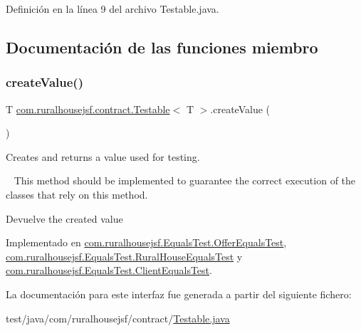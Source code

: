 Definición en la línea 9 del archivo Testable.\+java.



\subsection{Documentación de las funciones miembro}
\mbox{\label{interfacecom_1_1ruralhousejsf_1_1contract_1_1_testable_ae4546a381488faaba1ef7c0f8688de9c}} 
\subsubsection{\texorpdfstring{createValue()}{createValue()}}
{\footnotesize\ttfamily T \mbox{\hyperlink{interfacecom_1_1ruralhousejsf_1_1contract_1_1_testable}{com.\+ruralhousejsf.\+contract.\+Testable}}$<$ T $>$.create\+Value (\begin{DoxyParamCaption}{ }\end{DoxyParamCaption})}



Creates and returns a value used for testing. 

~\newline
 This method should be implemented to guarantee the correct execution of the classes that rely on this method.

\begin{DoxyReturn}{Devuelve}
the created value 
\end{DoxyReturn}


Implementado en \mbox{\hyperlink{classcom_1_1ruralhousejsf_1_1_equals_test_1_1_offer_equals_test_a25524d0ab8278899774751c0f7630e8d}{com.\+ruralhousejsf.\+Equals\+Test.\+Offer\+Equals\+Test}}, \mbox{\hyperlink{classcom_1_1ruralhousejsf_1_1_equals_test_1_1_rural_house_equals_test_abcab55b3e63c8d5511f04e395ff0f111}{com.\+ruralhousejsf.\+Equals\+Test.\+Rural\+House\+Equals\+Test}} y \mbox{\hyperlink{classcom_1_1ruralhousejsf_1_1_equals_test_1_1_client_equals_test_aa74f54ea042862db1a5499d31ec75539}{com.\+ruralhousejsf.\+Equals\+Test.\+Client\+Equals\+Test}}.



La documentación para este interfaz fue generada a partir del siguiente fichero\+:\begin{DoxyCompactItemize}
\item 
test/java/com/ruralhousejsf/contract/\mbox{\hyperlink{_testable_8java}{Testable.\+java}}\end{DoxyCompactItemize}
